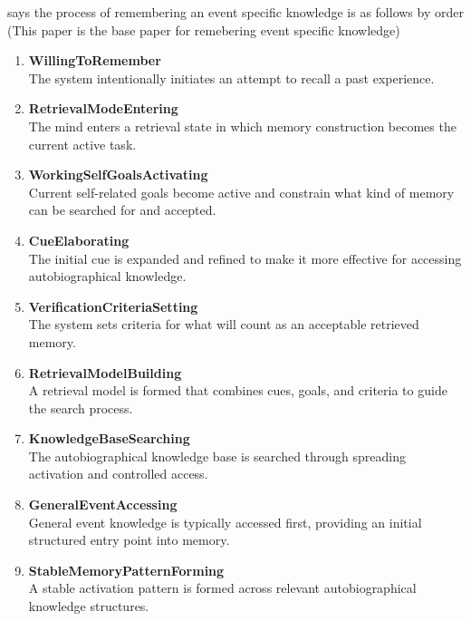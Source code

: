 \documentclass{book}
\begin{document}
\cite{conway-2000-the-construction-of-autobiographical-memories-in-the-self-memory-system} says the process of remembering an event specific knowledge is as follows by order (This paper is the base paper for remebering event specific knowledge)
    \begin{enumerate}
        \item \textbf{WillingToRemember}\\
        The system intentionally initiates an attempt to recall a past experience.
        
        \item \textbf{RetrievalModeEntering}\\
        The mind enters a retrieval state in which memory construction becomes the current active task.
        
        \item \textbf{WorkingSelfGoalsActivating}\\
        Current self-related goals become active and constrain what kind of memory can be searched for and accepted.
        
        \item \textbf{CueElaborating}\\
        The initial cue is expanded and refined to make it more effective for accessing autobiographical knowledge.
        
        \item \textbf{VerificationCriteriaSetting}\\
        The system sets criteria for what will count as an acceptable retrieved memory.
        
        \item \textbf{RetrievalModelBuilding}\\
        A retrieval model is formed that combines cues, goals, and criteria to guide the search process.
        
        \item \textbf{KnowledgeBaseSearching}\\
        The autobiographical knowledge base is searched through spreading activation and controlled access.
        
        \item \textbf{GeneralEventAccessing}\\
        General event knowledge is typically accessed first, providing an initial structured entry point into memory.
        
        \item \textbf{StableMemoryPatternForming}\\
        A stable activation pattern is formed across relevant autobiographical knowledge structures.
        

\end{enumerate}
\end{document}
